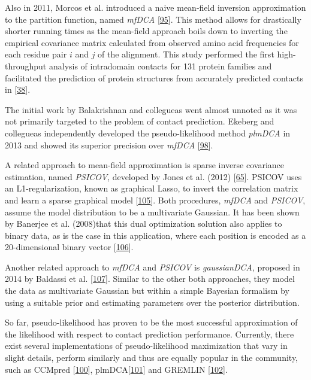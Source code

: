 \documentclass[11pt,a4paper,twoside]{book}
\theoremstyle{definition}
\theoremstyle{definition}
\theoremstyle{remark}
\begin{document}
Also in 2011, Morcos et al. introduced a naive mean-field inversion
approximation to the partition function, named \emph{mfDCA}
{[}\protect\hyperlink{ref-Morcos2011}{95}{]}. This method allows for
drastically shorter running times as the mean-field approach boils down
to inverting the empirical covariance matrix calculated from observed
amino acid frequencies for each residue pair \(i\) and \(j\) of the
alignment. This study performed the first high-throughput analysis of
intradomain contacts for 131 protein families and facilitated the
prediction of protein structures from accurately predicted contacts in
{[}\protect\hyperlink{ref-Marks2011}{38}{]}.

The initial work by Balakrishnan and collegueas went almost unnoted as
it was not primarily targeted to the problem of contact prediction.
Ekeberg and collegueas independently developed the pseudo-likelihood
method \emph{plmDCA} in 2013 and showed its superior precision over
\emph{mfDCA} {[}\protect\hyperlink{ref-Ekeberg2013}{98}{]}.

A related approach to mean-field approximation is sparse inverse
covariance estimation, named \emph{PSICOV}, developed by Jones et al.
(2012) {[}\protect\hyperlink{ref-Jones2012}{65}{]}. PSICOV uses an
L1-regularization, known as graphical Lasso, to invert the correlation
matrix and learn a sparse graphical model
{[}\protect\hyperlink{ref-Friedman2008}{105}{]}. Both procedures,
\emph{mfDCA} and \emph{PSICOV}, assume the model distribution to be a
multivariate Gaussian. It has been shown by Banerjee et al. (2008)that
this dual optimization solution also applies to binary data, as is the
case in this application, where each position is encoded as a
20-dimensional binary vector
{[}\protect\hyperlink{ref-Banerjee2008}{106}{]}.

Another related approach to \emph{mfDCA} and \emph{PSICOV} is
\emph{gaussianDCA}, proposed in 2014 by Baldassi et al.
{[}\protect\hyperlink{ref-Baldassi2014}{107}{]}. Similar to the other
both approaches, they model the data as multivariate Gaussian but within
a simple Bayesian formalism by using a suitable prior and estimating
parameters over the posterior distribution.

So far, pseudo-likelihood has proven to be the most successful
approximation of the likelihood with respect to contact prediction
performance. Currently, there exist several implementations of
pseudo-likelihood maximization that vary in slight details, perform
similarly and thus are equally popular in the community, such as CCMpred
{[}\protect\hyperlink{ref-Seemayer2014}{100}{]},
plmDCA{[}\protect\hyperlink{ref-Ekeberg2014}{101}{]} and GREMLIN
{[}\protect\hyperlink{ref-Kamisetty2013}{102}{]}.
\end{document}

